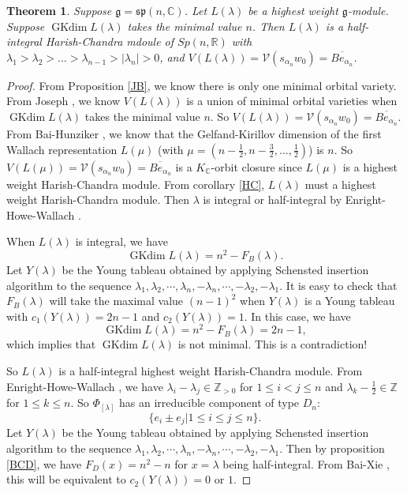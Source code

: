 \documentclass{amsart}[12pt]
\newtheorem{Thm}[Lem]{Theorem}
\newcommand{\gkd}{\operatorname{GKdim}}
\numberwithin{equation}{section}
\begin{document}
\begin{Thm}
		Suppose $\mathfrak{g}=\mathfrak{sp }(n, \mathbb{C})$. Let $L(\lambda)$ be a highest weight $\mathfrak{g}$-module. Suppose $\gkd L(\lambda)$ takes the minimal value $n$. Then
	$L(\lambda)$ is a half-integral Harish-Chandra mdoule of $Sp(n, \mathbb{R})$ with $\lambda_1>\lambda_2>...>\lambda_{n-1}>|\lambda_n|>0$,  and $V(L(\lambda))=\mathcal{V}(s_{\alpha_{n}}w_0)=\overline{Be_{\alpha_{n}}}$.

\end{Thm}

\begin{proof}
From Proposition \ref{JB}, we know there is only one minimal orbital variety. From Joseph \cite{Jo98}, we know $V(L(\lambda))$ is a union of minimal orbital varieties when  $\gkd L(\lambda)$ takes the minimal value $n$. So $V(L(\lambda))=\mathcal{V}(s_{\alpha_{n}}w_0)=\overline{Be_{\alpha_{n}}}$.
From Bai-Hunziker \cite{BH}, we know that the Gelfand-Kirillov dimension of the first Wallach representation $L(\mu)$ (with $\mu=(n-\frac{1}{2},n-\frac{3}{2},...,\frac{1}{2})$) is $n$.
So $V(L(\mu))=\mathcal{V}(s_{\alpha_{n}}w_0)=\overline{Be_{\alpha_{n}}}$ is a $K_{\mathbb{C}}$-orbit closure since $L(\mu)$ is a highest weight Harish-Chandra module.
From corollary \ref{HC}, $L(\lambda)$ must a highest weight Harish-Chandra module. Then $\lambda$ is integral or half-integral by Enright-Howe-Wallach \cite{EHW}.


When $L(\lambda)$ is integral,  we have
\[
\gkd L(\lambda)=n^2-F_B(\lambda).
\]
Let $ Y(\lambda) $ be the  Young tableau obtained by applying Schensted insertion algorithm to the sequence \(
\lambda_1,\lambda_2,\cdots,\lambda_n,-\lambda_n,\cdots,-\lambda_2,-\lambda_1.\)	
It is easy to check that $F_B(\lambda)$  will take the maximal value $(n-1)^2$ when $ Y(\lambda) $ is a Young tableau with $c_1(Y(\lambda))=2n-1$ and  $c_2(Y(\lambda))=1$. In this case, we have \[
\gkd L(\lambda)=n^2-F_B(\lambda)=2n-1,
\]
which implies that $\gkd L(\lambda)$ is not minimal. This is a contradiction!

So $L(\lambda)$ is a half-integral highest weight Harish-Chandra module. From Enright-Howe-Wallach \cite{EHW}, we have $\lambda_i-\lambda_j \in \mathbb{Z}_{> 0}$ for $1\leq i<j\leq n$ and $\lambda_k-\frac{1}{2} \in \mathbb{Z}$ for $1\leq k\leq n$.
So $\Phi_{[\lambda]}$ has an irreducible component of type $D_n$:
$$\{e_i \pm e_j|1\leq i\leq j\leq n\}.$$
Let $ Y(\lambda) $ be the  Young tableau obtained by applying Schensted insertion algorithm to the sequence \(
\lambda_1,\lambda_2,\cdots,\lambda_n,-\lambda_n,\cdots,-\lambda_2,-\lambda_1\).	Then by proposition \ref{BCD}, we have $F_D(x)=n^2-n$ for $x=\lambda$ being half-integral. From Bai-Xie \cite{BX-2}, this will be equivalent to
$c_2(Y(\lambda))=0$ or $1$.


\end{proof}
\end{document}

